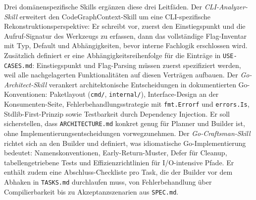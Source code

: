 Drei domänenspezifische Skills ergänzen diese drei Leitfäden. Der \emph{CLI-Analyzer-Skill} erweitert den CodeGraphContext-Skill um eine CLI-spezifische Rekonstruktionsperspektive: Er schreibt vor, zuerst den Einstiegspunkt und die Aufruf-Signatur des Werkzeugs zu erfassen, dann das vollständige Flag-Inventar mit Typ, Default und Abhängigkeiten, bevor interne Fachlogik erschlossen wird. Zusätzlich definiert er eine Abhängigkeitsreihenfolge für die Einträge in \texttt{USE-CASES.md}: Einstiegspunkt und Flag-Parsing müssen zuerst spezifiziert werden, weil alle nachgelagerten Funktionalitäten auf diesen Verträgen aufbauen. Der \emph{Go-Architect-Skill} verankert architektonische Entscheidungen in dokumentierten Go-Konventionen: Paketlayout (\texttt{cmd/}, \texttt{internal/}), Interface-Design an der Konsumenten-Seite, Fehlerbehandlungsstrategie mit \texttt{fmt.Errorf} und \texttt{errors.Is}, Stdlib-First-Prinzip sowie Testbarkeit durch Dependency Injection. Er soll sicherstellen, dass \texttt{ARCHITECTURE.md} konkret genug für Planner und Builder ist, ohne Implementierungsentscheidungen vorwegzunehmen. Der \emph{Go-Craftsman-Skill} richtet sich an den Builder und definiert, was idiomatische Go-Implementierung bedeutet: Namenskonventionen, Early-Return-Muster, Defer für Cleanup, tabellengetriebene Tests und Effizienzrichtlinien für I/O-intensive Pfade. Er enthält zudem eine Abschluss-Checkliste pro Task, die der Builder vor dem Abhaken in \texttt{TASKS.md} durchlaufen muss, von Fehlerbehandlung über Compilierbarkeit bis zu Akzeptanzszenarien aus \texttt{SPEC.md}.

